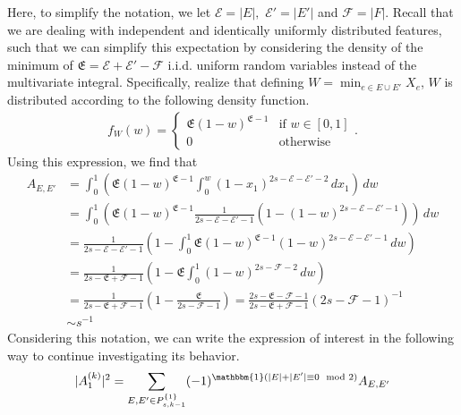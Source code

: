 \documentclass[letterpaper,10pt]{article}
\numberwithin{equation}{section}
\numberwithin{thm}{section}
\newcommand{\1}{\mathbb{1}}
\begin{document}
Here, to simplify the notation, we let $\mathcal{E} = |E|,$ $\mathcal{E}' = |E'|$ and $\mathcal{F} = |F|$.
Recall that we are dealing with independent and identically uniformly distributed features, such that we can simplify this expectation by considering the density of the minimum of $\mathfrak{E} = \mathcal{E} + \mathcal{E}' - \mathcal{F}$ i.i.d. uniform random variables instead of the multivariate integral.
Specifically, realize that defining $W = \min_{e \in E \cup E'} X_e$, $W$ is distributed according to the following density function.
\begin{equation*}
	\begin{aligned}
		f_W(w) = \begin{cases}
			         \mathfrak{E}\left(1-w\right)^{\mathfrak{E}- 1} & \text{if } w \in [0,1] \\
			         0                                              & \text{otherwise}
		         \end{cases}.
	\end{aligned}
\end{equation*}
Using this expression, we find that
\begin{equation*}
	\begin{aligned}
		A_{E, E'}
		 & = \int_{0}^{1}\left(\mathfrak{E}\left(1-w\right)^{\mathfrak{E}- 1}\int_{0}^{w} (1-x_1)^{2s - \mathcal{E} - \mathcal{E}' - 2} \, dx_1 \right) \, dw                                                     \\
		 & = \int_{0}^{1}\left(\mathfrak{E}\left(1-w\right)^{\mathfrak{E}- 1} \frac{1}{2s - \mathcal{E} - \mathcal{E}' - 1}\left(1 - \left(1 - w\right)^{2s - \mathcal{E} - \mathcal{E}' - 1}\right)\right) \, dw \\
		 & =  \frac{1}{2s - \mathcal{E} - \mathcal{E}' - 1}\left(1 -\int_{0}^{1} \mathfrak{E}\left(1-w\right)^{\mathfrak{E}- 1}\left(1 - w\right)^{2s - \mathcal{E} - \mathcal{E}' - 1} \, dw\right)              \\
		 & =  \frac{1}{2s - \mathfrak{E} + \mathcal{F} - 1}\left(1 - \mathfrak{E}\int_{0}^{1} \left(1 - w\right)^{2s - \mathcal{F} - 2} \, dw\right)                                                              \\
		 & = \frac{1}{2s - \mathfrak{E} + \mathcal{F} - 1}\left(1 - \frac{\mathfrak{E}}{2s - \mathcal{F} - 1}\right)
		= \frac{2s -\mathfrak{E} - \mathcal{F} - 1 }{2s - \mathfrak{E} + \mathcal{F} - 1}\left(2s - \mathcal{F} - 1\right)^{-1}                                                                                   \\
		 & \sim s^{-1}
	\end{aligned}
\end{equation*}
Considering this notation, we can write the expression of interest in the following way to continue investigating its behavior.
\begin{equation*}
	\begin{aligned}
		|A_1^{(k)}|^2
		= \sum_{E, E' \in P_{s,k-1}^{\{1\}}}(-1)^{\mathbbm{1}(|E| + | E'| \equiv 0 \mod 2)}A_{E, E'}
	\end{aligned}
\end{equation*}
\end{document}
